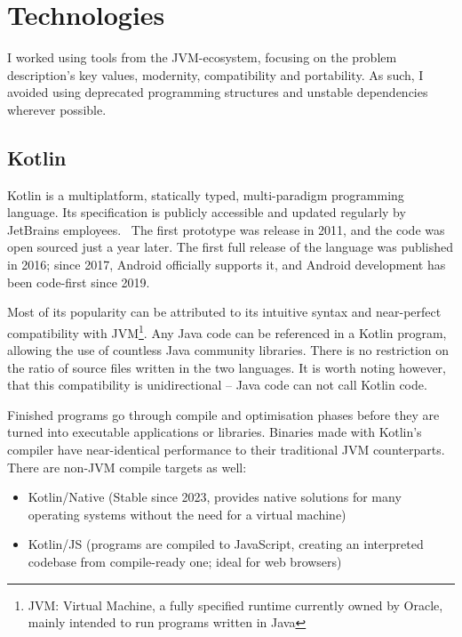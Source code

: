 \chapter{Technologies}

I worked using tools from the JVM-ecosystem, focusing on the problem description's key values, modernity, compatibility and portability. As such, I avoided using deprecated programming structures and unstable dependencies wherever possible.

\section{Kotlin }

Kotlin is a multiplatform, statically typed, multi-paradigm programming language. Its specification is publicly accessible and updated regularly by JetBrains employees.~\cite{KotlinSpec} The first prototype was release in 2011, and the code was open sourced just a year later. The first full release of the language was published in 2016; since 2017, Android officially supports it, and Android development has been code-first since 2019.~\cite{KotlinPast}

Most of its popularity can be attributed to its intuitive syntax and near-perfect compatibility with JVM\footnote{JVM: \@Java Virtual Machine, a fully specified runtime currently owned by Oracle, mainly intended to run programs written in Java}. Any Java code can be referenced in a Kotlin program, allowing the use of countless Java community libraries. There is no restriction on the ratio of source files written in the two languages. It is worth noting however, that this compatibility is unidirectional -- Java code can not call Kotlin code.

Finished programs go through compile and optimisation phases before they are turned into executable applications or libraries. Binaries made with Kotlin's compiler have near-identical performance to their traditional JVM counterparts. There are non-JVM compile targets as well:
\begin{itemize}
    \item Kotlin/Native (Stable since 2023, provides native solutions for many operating systems without the need for a virtual machine)
    \item Kotlin/JS (programs are compiled to JavaScript, creating an interpreted codebase from compile-ready one; ideal for web browsers)
\end{itemize}


